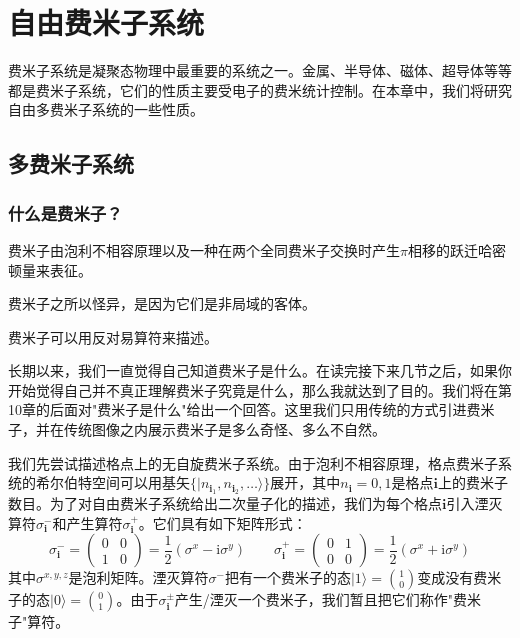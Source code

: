 
\chapter{自由费米子系统}

费米子系统是凝聚态物理中最重要的系统之一。金属、半导体、磁体、超导体等等都是费米子系统，它们的性质主要受电子的费米统计控制。在本章中，我们将研究自由多费米子系统的一些性质。

\section{多费米子系统}

\subsection{什么是费米子？}

\begin{keypoints}
\item 费米子由泡利不相容原理以及一种在两个全同费米子交换时产生$\pi$相移的跃迁哈密顿量来表征。
\item 费米子之所以怪异，是因为它们是非局域的客体。
\item 费米子可以用反对易算符来描述。
\end{keypoints}

长期以来，我们一直觉得自己知道费米子是什么。在读完接下来几节之后，如果你开始觉得自己并不真正理解费米子究竟是什么，那么我就达到了目的。我们将在第10章的后面对"费米子是什么"给出一个回答。这里我们只用传统的方式引进费米子，并在传统图像之内展示费米子是多么奇怪、多么不自然。

我们先尝试描述格点上的无自旋费米子系统。由于泡利不相容原理，格点费米子系统的希尔伯特空间可以用基矢$\{|n_{\pmb{i}_1},n_{\pmb{i}_2},\ldots\rangle\}$展开，其中$n_{\pmb{i}}=0,1$是格点$\pmb{i}$上的费米子数目。为了对自由费米子系统给出二次量子化的描述，我们为每个格点$\pmb{i}$引入湮灭算符$\sigma_{\pmb{i}}^{-}$和产生算符$\sigma_{\pmb{i}}^{+}$。它们具有如下矩阵形式：
\begin{equation*}
\sigma_{\pmb{i}}^{-}=\begin{pmatrix}0 & 0\\ 1 & 0\end{pmatrix}=\frac{1}{2}(\sigma^{x}-\mathrm{i}\sigma^{y})
\qquad
\sigma_{\pmb{i}}^{+}=\begin{pmatrix}0 & 1\\ 0 & 0\end{pmatrix}=\frac{1}{2}(\sigma^{x}+\mathrm{i}\sigma^{y})
\end{equation*}
其中$\sigma^{x,y,z}$是泡利矩阵。湮灭算符$\sigma^{-}$把有一个费米子的态$|1\rangle=\binom{1}{0}$变成没有费米子的态$|0\rangle=\binom{0}{1}$。由于$\sigma_{\pmb{i}}^{\pm}$产生/湮灭一个费米子，我们暂且把它们称作"费米子"算符。

